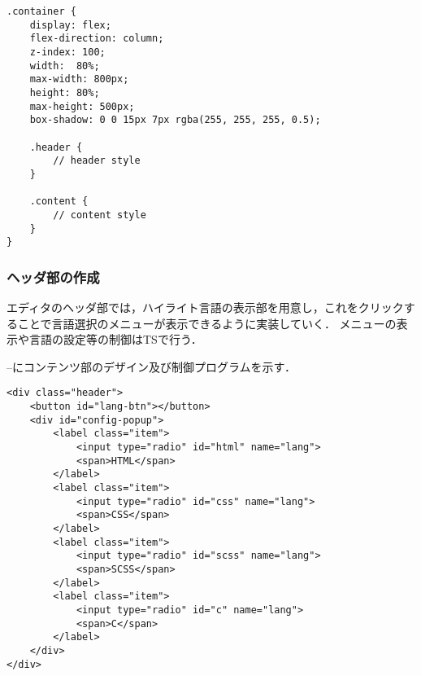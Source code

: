 \documentclass[autodetect-engine,dvi=dvipdfmx,ja=standard,
               a4j,11pt]{bxjsarticle}
\newcommand{\figref}[1]{\makebox{図~\ref{#1}}}
\begin{document}
\begin{lstlisting}[caption={\tt style.scss(エディタ枠組み抜粋)}, label={prog:editor-base-scss}]
.container {
    display: flex;
    flex-direction: column;
    z-index: 100;
    width:  80%;
    max-width: 800px;
    height: 80%;
    max-height: 500px;
    box-shadow: 0 0 15px 7px rgba(255, 255, 255, 0.5);

    .header {
        // header style
    }

    .content {
        // content style
    }
}
\end{lstlisting}

\subsubsection{ヘッダ部の作成}

エディタのヘッダ部では，ハイライト言語の表示部を用意し，これをクリックすることで言語選択のメニューが表示できるように実装していく．
メニューの表示や言語の設定等の制御はTSで行う．

\figref{prog:head-html}--\figref{prog:head-ts}にコンテンツ部のデザイン及び制御プログラムを示す．

\begin{lstlisting}[caption={{\tt index.html(ヘッダ部抜粋)}}, label={prog:head-html}]
<div class="header">
    <button id="lang-btn"></button>
    <div id="config-popup">
        <label class="item">
            <input type="radio" id="html" name="lang">
            <span>HTML</span>
        </label>
        <label class="item">
            <input type="radio" id="css" name="lang">
            <span>CSS</span>
        </label>
        <label class="item">
            <input type="radio" id="scss" name="lang">
            <span>SCSS</span>
        </label>
        <label class="item">
            <input type="radio" id="c" name="lang">
            <span>C</span>
        </label>
    </div>
</div>
\end{lstlisting}
\end{document}
